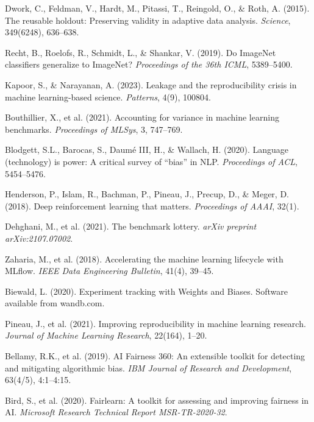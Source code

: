 \documentclass[10pt]{article}
\begin{document}
\begin{thebibliography}{99}

Dwork, C., Feldman, V., Hardt, M., Pitassi, T., Reingold, O., \& Roth, A. (2015). The reusable holdout: Preserving validity in adaptive data analysis. \textit{Science}, 349(6248), 636--638.

Recht, B., Roelofs, R., Schmidt, L., \& Shankar, V. (2019). Do ImageNet classifiers generalize to ImageNet? \textit{Proceedings of the 36th ICML}, 5389--5400.

Kapoor, S., \& Narayanan, A. (2023). Leakage and the reproducibility crisis in machine learning-based science. \textit{Patterns}, 4(9), 100804.

Bouthillier, X., et al. (2021). Accounting for variance in machine learning benchmarks. \textit{Proceedings of MLSys}, 3, 747--769.

Blodgett, S.L., Barocas, S., Daumé III, H., \& Wallach, H. (2020). Language (technology) is power: A critical survey of ``bias'' in NLP. \textit{Proceedings of ACL}, 5454--5476.

Henderson, P., Islam, R., Bachman, P., Pineau, J., Precup, D., \& Meger, D. (2018). Deep reinforcement learning that matters. \textit{Proceedings of AAAI}, 32(1).

Dehghani, M., et al. (2021). The benchmark lottery. \textit{arXiv preprint arXiv:2107.07002}.

Zaharia, M., et al. (2018). Accelerating the machine learning lifecycle with MLflow. \textit{IEEE Data Engineering Bulletin}, 41(4), 39--45.

Biewald, L. (2020). Experiment tracking with Weights and Biases. Software available from wandb.com.

Pineau, J., et al. (2021). Improving reproducibility in machine learning research. \textit{Journal of Machine Learning Research}, 22(164), 1--20.

Bellamy, R.K., et al. (2019). AI Fairness 360: An extensible toolkit for detecting and mitigating algorithmic bias. \textit{IBM Journal of Research and Development}, 63(4/5), 4:1--4:15.

Bird, S., et al. (2020). Fairlearn: A toolkit for assessing and improving fairness in AI. \textit{Microsoft Research Technical Report MSR-TR-2020-32}.


\end{thebibliography}
\end{document}
